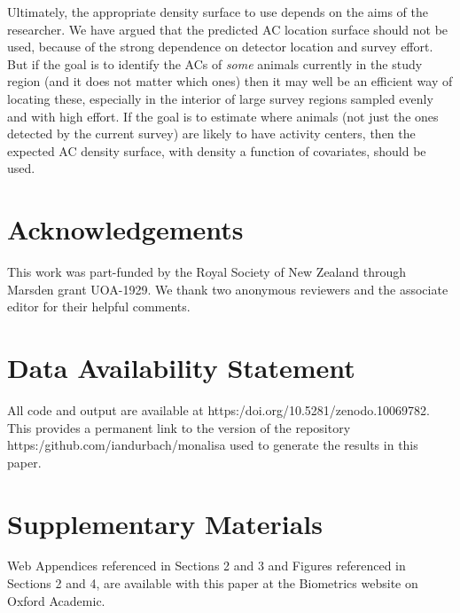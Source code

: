 \documentclass[useAMS,usenatbib,referee]{biom}
\begin{document}
Ultimately, the appropriate density surface to use depends on the aims of the researcher. We have argued that the predicted AC location surface should not be used, because of the strong dependence on detector location and survey effort. But if the goal is to identify the ACs of {\it some} animals currently in the study region (and it does not matter which ones) then it may well be an efficient way of locating these, especially in the interior of large survey regions sampled evenly and with high effort. If the goal is to estimate where animals (not just the ones detected by the current survey) are likely to have activity centers, then the expected AC density surface, with density a function of covariates, should be used.

\section*{Acknowledgements}

This work was part-funded by the Royal Society of New Zealand through Marsden grant UOA-1929. We thank two anonymous reviewers and the associate editor for their helpful comments.

\section*{Data Availability Statement}
All code and output are available at https:/doi.org/10.5281/zenodo.10069782. This provides a permanent link to the version of the repository https:/github.com/iandurbach/monalisa used to generate the results in this paper.




\section*{Supplementary Materials}
Web Appendices referenced in Sections 2 and 3 and Figures referenced in Sections 2 and 4, are available with this paper at the Biometrics website on Oxford Academic.
\end{document}
